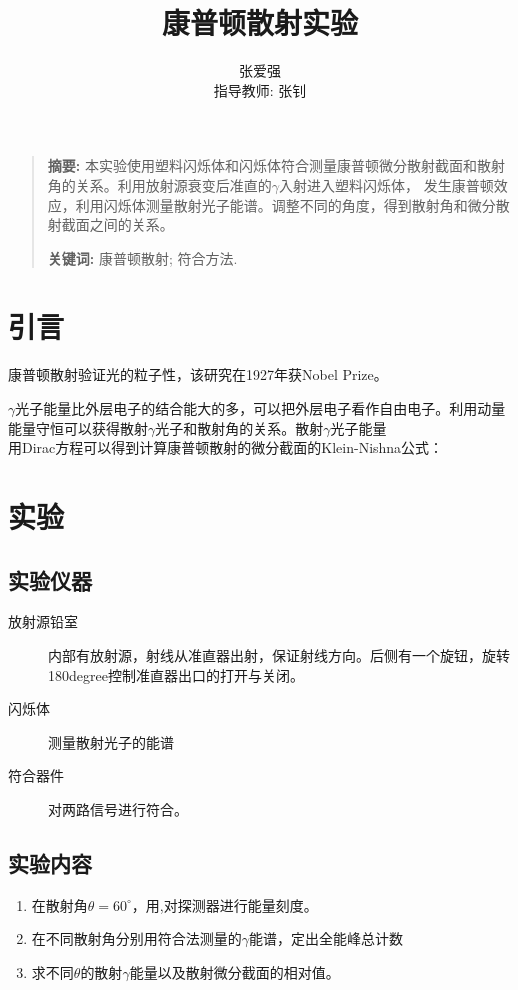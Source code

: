 \documentclass[10pt]{ctexart}
\title{康普顿散射实验}
\author{张爱强\\指导教师: 张钊}
\date{}
\newenvironment{sciabstract}{%
\begin{quote} \textbf{摘要: }}
{\end{quote}}
\begin{document}
\maketitle
\begin{sciabstract}
    本实验使用塑料闪烁体和闪烁体符合测量康普顿微分散射截面和散射角的关系。利用放射源衰变后准直的$\gamma$入射进入塑料闪烁体，
    发生康普顿效应，利用闪烁体测量散射光子能谱。调整不同的角度，得到散射角和微分散射截面之间的关系。
    \par\textbf{关键词: } 康普顿散射; 符合方法.
\end{sciabstract}
\section{引言}
康普顿散射验证光的粒子性，该研究在1927年获Nobel Prize。

$\gamma$光子能量比外层电子的结合能大的多，可以把外层电子看作自由电子。利用动量能量守恒可以获得散射$\gamma$光子和散射角的关系。散射$\gamma$光子能量
\[\]
用Dirac方程可以得到计算康普顿散射的微分截面的Klein-Nishna公式：
\[\]
\section{实验}
\subsection{实验仪器}
\begin{description}
    \item[放射源铅室] 内部有放射源，射线从准直器出射，保证射线方向。后侧有一个旋钮，旋转180\si{degree}控制准直器出口的打开与关闭。 
    \item[闪烁体] 测量散射光子的能谱
    \item[符合器件] 对两路信号进行符合。
\end{description}

\subsection{实验内容}
\begin{enumerate}
    \item 在散射角$\theta=60^\circ$，用,对探测器进行能量刻度。
    \item 在不同散射角分别用符合法测量的$\gamma$能谱，定出全能峰总计数
    \item 求不同$\theta$的散射$\gamma$能量以及散射微分截面的相对值。
\end{enumerate}
\end{document}
